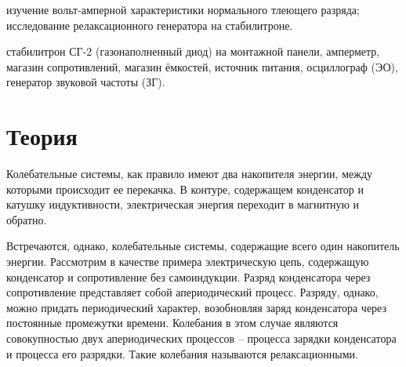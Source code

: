 \documentclass[a4paper,14pt]{article}
\begin{document}
\author{Рябых Владислав и Исыпов Илья, Б05-905}
\title{}
\maketitle

 изучение вольт-амперной характеристики нормального
тлеющего разряда; исследование релаксационного генератора на
стабилитроне.

 стабилитрон СГ-2 (газонаполненный диод) на монтажной панели, амперметр, магазин сопротивлений, магазин ёмкостей, источник
питания, осциллограф (ЭО), генератор звуковой частоты (ЗГ).


\section*{Теория}
Колебательные системы, как правило имеют два накопителя энергии, между которыми происходит ее перекачка. В контуре, содержащем конденсатор и катушку индуктивности, электрическая энергия переходит в магнитную и обратно.

Встречаются, однако, колебательные системы, содержащие всего один накопитель энергии. Рассмотрим в качестве примера электрическую цепь, содержащую конденсатор и сопротивление без самоиндукции. Разряд конденсатора через сопротивление представляет собой апериодический процесс. Разряду, однако, можно придать периодический характер, возобновляя заряд конденсатора через постоянные промежутки времени. Колебания в этом случае являются совокупностью двух апериодических процессов -- процесса зарядки конденсатора и процесса его разрядки. Такие колебания называются релаксационными. 
\end{document}
